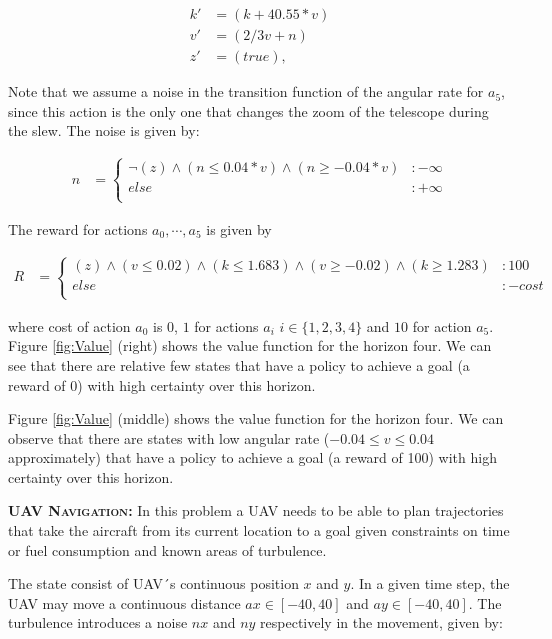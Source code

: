 {\footnotesize
\begin{align*}
k' & =( k + 40.55*v) \\
v'& =(2/3 v + n) \\
z'& =( true ),
\end{align*}}

Note that we assume a noise in the transition function of the angular rate for $a_5$, since this action is the only one that changes the zoom of the telescope during the slew. The noise is given by:

{\footnotesize
\begin{align*}
n & = \begin{cases}
\neg (z) \wedge (n \leq 0.04*v) \wedge (n \geq -0.04*v) &:-\infty\\
else &: +\infty\\
\end{cases}
\end{align*}}

The reward for actions $a_0, \cdots ,a_5$ is given by  

{\tiny
\begin{align*}
R & = \begin{cases}
(z) \wedge (v \leq 0.02) \wedge (k \leq 1.683) \wedge (v \geq -0.02) \wedge (k \geq 1.283) &:100\\
else &: -cost\\
\end{cases}
\end{align*}}

where cost of action $a_0$  is 0, $1$ for actions $a_i$ $i \in \{1,2,3,4\}$ and $10$ for action $a_5$.
Figure \ref{fig:Value} (right) shows the value function for the horizon four. We can see that there are relative few states that have a policy to achieve a goal (a reward of 0) with high certainty over this horizon.


Figure \ref{fig:Value} (middle) shows the value function for the horizon four. We can observe  that there are states with low angular rate ($-0.04\leq v \leq 0.04$ approximately) that have a policy to achieve a goal (a reward of 100) with high certainty over this horizon.


{\bf \textsc{UAV Navigation}:}
In this problem a UAV needs to be able to plan
trajectories that take the aircraft from its current location to
a goal given constraints on time or fuel
consumption and known areas of turbulence.

The state consist of UAV´s continuous position $x$ and $y$.
In a given time step, the UAV may move a continuous distance $ax \in [-40,40]$ and $ay \in [-40,40]$. The turbulence introduces a noise $nx$ and $ny$ respectively in the movement, given by:

